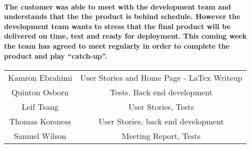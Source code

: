 \documentclass[12pt]{article}
\begin{document}
\paragraph{\normalfont \indent The customer was able to meet with the development team and understands that the the product is behind schedule. However the development team wants to stress that the final product will be delivered on time, test and ready for deployment. This coming week the team has agreed to meet regularly in order to complete the product and play “catch-up”.
}

\begin{center}
\begin{tabular}{ |c|c| }
 \hline
 Kamron Ebrahimi & User Stories and Home Page - LaTex Writeup \\
 Quinton Osborn & Tests, Back end development \\
 Leif Tsang & User Stories, Tests \\
 Thomas Korsness & User Stories, back end development  \\
 Samuel Wilson &  Meeting Report, Tests \\
 \hline
\end{tabular}
\end{center}
\end{document}
